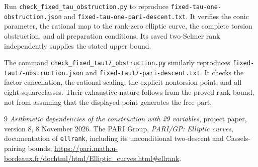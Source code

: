 \documentclass[11pt,a4paper]{article}
\theoremstyle{definition}\newtheorem{definition}[theorem]{Definition}
\begin{document}
Run \nolinkurl{check_fixed_tau_obstruction.py} to reproduce
\nolinkurl{fixed-tau-one-obstruction.json} and
\nolinkurl{fixed-tau-one-pari-descent.txt}. It verifies the conic
parameter, the rational map to the rank-zero elliptic curve, the
complete torsion obstruction, and all preparation conditions. Its
saved two-Selmer rank independently supplies the stated upper bound.

The command \nolinkurl{check_fixed_tau17_obstruction.py} similarly
reproduces \nolinkurl{fixed-tau17-obstruction.json} and
\nolinkurl{fixed-tau17-pari-descent.txt}. It checks the factor
cancellation, the rational scaling, the explicit nontorsion point,
and all eight squareclasses. Their exhaustive nature follows from
the proved rank bound, not from assuming that the displayed point
generates the free part.

\begin{thebibliography}{9}\small
{}
\emph{Arithmetic dependencies of the construction with 29 variables},
project paper, version 8, 8 November 2026.
The PARI Group, \emph{PARI/GP: Elliptic curves}, documentation of
\texttt{ellrank}, including its unconditional two-descent and
Cassels-pairing bounds,
\url{https://pari.math.u-bordeaux.fr/dochtml/html/Elliptic_curves.html\#ellrank}.
\end{thebibliography}
\end{document}
